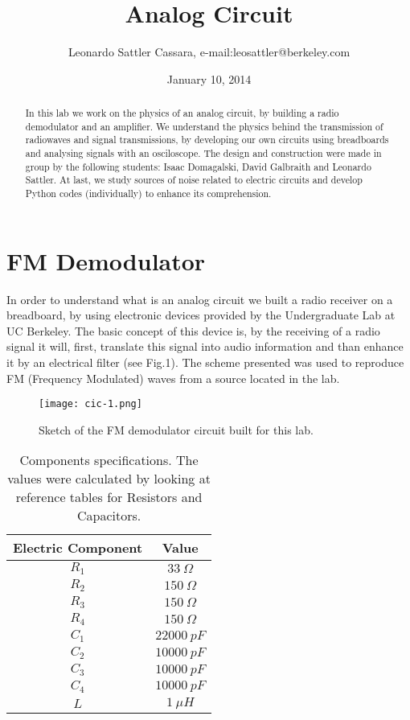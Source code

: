\documentclass{article}
\begin{document}
\title{Analog Circuit}
\author{Leonardo Sattler Cassara, e-mail:leosattler@berkeley.com}
\date{January 10, 2014}
\maketitle

\begin{abstract}
In this lab we work on the physics of an analog circuit, by building a
radio demodulator and an amplifier. We understand the physics behind the transmission of radiowaves and signal transmissions, by developing our own circuits using breadboards and analysing signals with an osciloscope. The design and construction were made in group by the following students: Isaac Domagalski, David Galbraith and Leonardo Sattler. At last, we study sources of noise related to electric circuits and develop Python codes (individually) to enhance its comprehension. 

\end{abstract}


\section{FM Demodulator} 

In order to understand what is an analog circuit we built a radio receiver on a breadboard, by using electronic devices provided by the Undergraduate Lab at UC Berkeley. The basic concept of this device is, by the receiving
of a radio signal it will, first, translate this signal into audio information and than enhance it by an electrical filter (see Fig.1). The scheme presented was used to reproduce FM (Frequency Modulated) waves from a source located in the lab. 

\begin{figure}[H]
\center
\texttt{[image: cic-1.png]}
\caption {Sketch of the FM demodulator circuit built for this lab.} 
\label{Fig:3}
\end{figure}

\begin{table}[H]
\center
\begin{tabular}{|c|c|}
\hline
Electric Component    &   Value    \\ 
\hline
$R_{1}$ & $33 \ \Omega$ \\ 
\hline
$R_{2}$ & $150 \ \Omega$ \\ 
\hline
$R_{3}$ & $150 \ \Omega$ \\ 
\hline
$R_{4}$ & $150 \ \Omega$ \\ 
\hline
$C_{1}$ & $22000 \ pF$ \\ 
\hline
$C_{2}$ & $10000 \ pF$ \\ 
\hline
$C_{3}$ & $10000 \ pF$ \\ 
\hline
$C_{4}$ & $10000 \ pF$ \\ 
\hline
$L$ & $1 \ \mu H$ \\ 
\hline
\end{tabular}
\caption{Components specifications. The values were calculated by looking at reference tables for Resistors and Capacitors.} 
\label{tab:1}
\end{table}
\end{document}
